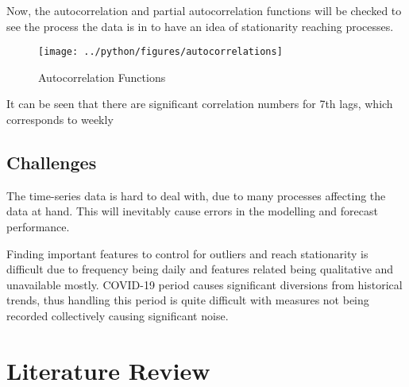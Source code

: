 \documentclass[11pt, a4paper, leqno]{article}
\begin{document}
Now, the autocorrelation and partial autocorrelation functions will be checked to see the process the data is in to have an idea of stationarity reaching processes.

\begin{figure}[H]

    \centering
    \texttt{[image: ../python/figures/autocorrelations]}

    \caption{Autocorrelation Functions}
    \label{fig:hourly_consumption}

\end{figure}

It can be seen that there are significant correlation numbers for 7th lags, which corresponds to weekly



\subsection{Challenges}
\label{subsec:chall}

The time-series data is hard to deal with, due to many processes affecting the data at hand. This will inevitably cause errors in the modelling and forecast performance.

Finding important features to control for outliers and reach stationarity is difficult due to frequency being daily and features related being qualitative and unavailable mostly.
COVID-19 period causes significant diversions from historical trends, thus handling this period is quite difficult with measures not being recorded collectively causing significant noise.












\section{Literature Review} %
\label{sec:litrew}
\end{document}
